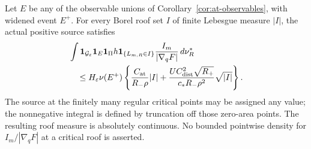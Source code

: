 \begin{lemma}
\label{lem:nh-singular-volume}
Let $E$ be any of the observable unions of
Corollary~\ref{cor:at-observables}, with widened event $E^+$.
For every Borel roof set $I$ of finite Lebesgue measure $|I|$,
the actual positive source satisfies
\begin{align}\label{eq:nh-singular-volume}
 &\int \mathbf1_{\mathcal G_\varepsilon}\mathbf1_E\mathbf1_\Pi h
        \mathbf1_{\{L_{m,R}\in I\}}
                      \frac{I_m}{|\nabla_qF|}\,d\nu_R^*\notag\\
 &\quad\le H_\varepsilon\nu(E^+)
 \left\{\frac{C_{\rm at}}{R_-\rho}|I|
       +\frac{U C_{\rm dist}^2\sqrt{R_+}}
                   {c_*R_-\rho^2}\sqrt{|I|}\right\}.
\end{align}
The source at the finitely many regular critical points may be
assigned any value; the nonnegative integral is defined by
truncation off those zero-area points.  The resulting roof
measure is absolutely continuous.  No bounded pointwise
density for $I_m/|\nabla_qF|$ at a critical roof is asserted.
\end{lemma}
